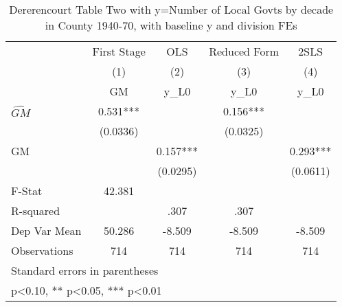 \begin{table}[htbp]\centering
\def\sym#1{\ifmmode^{#1}\else\(^{#1}\)\fi}
\caption{Dererencourt Table Two with y=Number of Local Govts by decade in County 1940-70, with baseline y and division FEs}
\begin{tabular}{l*{4}{c}}
\toprule
                    & First Stage   &         OLS   &Reduced Form   &        2SLS   \\
                    &\multicolumn{1}{c}{(1)}&\multicolumn{1}{c}{(2)}&\multicolumn{1}{c}{(3)}&\multicolumn{1}{c}{(4)}\\
                    &\multicolumn{1}{c}{GM}&\multicolumn{1}{c}{y\_L0}&\multicolumn{1}{c}{y\_L0}&\multicolumn{1}{c}{y\_L0}\\
\midrule
$\hat{GM}$          &       0.531***&               &       0.156***&               \\
                    &    (0.0336)   &               &    (0.0325)   &               \\
\addlinespace
GM                  &               &       0.157***&               &       0.293***\\
                    &               &    (0.0295)   &               &    (0.0611)   \\
\midrule
F-Stat              &      42.381   &               &               &               \\
R-squared           &               &        .307   &        .307   &               \\
Dep Var Mean        &      50.286   &      -8.509   &      -8.509   &      -8.509   \\
Observations        &         714   &         714   &         714   &         714   \\
\bottomrule
\multicolumn{5}{l}{\footnotesize Standard errors in parentheses}\\
\multicolumn{5}{l}{\footnotesize * p<0.10, ** p<0.05, *** p<0.01}\\
\end{tabular}
\end{table}
